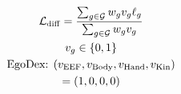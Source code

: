 \documentclass[border=7pt,varwidth=108mm]{standalone}
\begin{document}
\color{ink}\fontsize{15}{23}\selectfont
\[
\begin{gathered} \mathcal L_{\rm diff}=\frac{\sum_{g\in\mathcal G}w_gv_g\ell_g}{\sum_{g\in\mathcal G}w_gv_g}\\ v_g\in\{0,1\}\\ \text{EgoDex: }(v_{\rm EEF},v_{\rm Body},v_{\rm Hand},v_{\rm Kin})\\ =(1,0,0,0)\end{gathered}
\]
\end{document}
